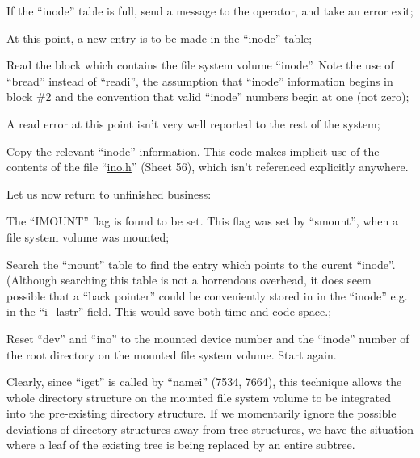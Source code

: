 \item[7309:] If the  ``inode''  table  is  full,
      send  a  message to the operator,
      and take an error exit;

\item[7314:] At this point, a new entry is  to
      be made in the ``inode'' table;

\item[7319:] Read the block which contains the
      file  system volume ``inode''. Note
      the use  of  ``bread''  instead  of
      ``readi'',   the   assumption  that
      ``inode''  information  begins   in
      block \#2  and the convention that
      valid ``inode''  numbers  begin  at
      one (not zero);

\item[7326:] A read error at this point isn't
      very well reported to the rest of       
      the system; 

\item[7328:] Copy the relevant ``inode'' 
information.  This code makes implicit
      use of the contents of  the  file
      ``\href{./v6/ino.h}{ino.h}''  (Sheet  56), which isn't
      referenced explicitly anywhere.
\ed

\noindent Let us now return to  unfinished  business:

\bd
\item[7292:] The ``IMOUNT'' flag is found to  be
      set.   This   flag   was  set  by
``smount'',  when  a  file   system
volume was mounted;

\item[7293:] Search the ``mount'' table to  find
      the  entry  which  points  to the
      curent    ``inode''.     (Although
      searching  this  table  is  not a
      horrendous overhead, it does seem
      possible  that  a  ``back pointer''
      could be conveniently  stored  in
      in   the   ``inode''  e.g.  in  the
      ``i\_lastr'' field. This would  save
      both time and code space.;

\item[7396:] Reset  ``dev''  and  ``ino''  to  the
      mounted  device  number  and  the
      ``inode'' number of the root directory  on  the mounted file system
      volume.  Start again.
\ed


Clearly,  since  ``iget''  is  called  by
``namei''  (7534,  7664),  this technique
allows the whole directory structure on
the  mounted  file  system volume to be
integrated into the pre-existing directory   structure.   If  we  momentarily
ignore  the  possible   deviations   of
directory  structures  away  from  tree
structures, we have the situation where
a  leaf  of  the existing tree is being
replaced by an entire subtree.


